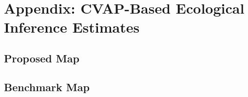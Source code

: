 \documentclass[12pt]{article}
\begin{document}
\clearpage
\appendix

\section{Appendix: CVAP-Based Ecological Inference Estimates}
\subsection{Proposed Map}





%






\clearpage




%






\clearpage




%






\clearpage




%






\clearpage




%







\newpage
\clearpage
\subsection{Benchmark Map}










\end{document}
